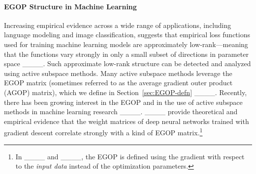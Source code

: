 \paragraph{EGOP Structure in Machine Learning}
    Increasing empirical evidence across a wide range of applications, including language modeling and image classification, suggests that empirical loss functions used for training machine learning models are approximately low-rank---meaning that the functions vary strongly in only a small subset of directions in parameter space ____. Such approximate low-rank structure can be detected and analyzed using active subspace methods. Many active subspace methods leverage the EGOP matrix (sometimes referred to as the average gradient outer product (AGOP) matrix), which we define in Section~\ref{sec:EGOP-defn}  ____. Recently, there has been growing interest in the EGOP and in the use of active subspace methods in machine learning research ____. ____ provide theoretical and empirical evidence that the weight matrices of deep neural networks trained with gradient descent correlate strongly with a kind of EGOP matrix.\footnote{In ____ and ____, the EGOP is defined using the gradient with respect to the \emph{input data} instead of the optimization parameters.}